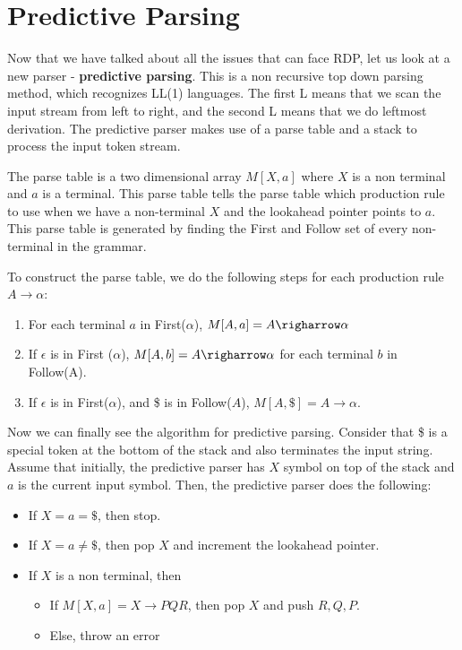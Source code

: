 \documentclass[12pt,letterpaper]{amsbook}
\theoremstyle{definition}
\begin{document}
\section{Predictive Parsing}

Now that we have talked about all the issues that can face RDP, let us look at a new parser - \textbf{predictive parsing}. This is a non recursive top down parsing method, which recognizes LL(1) languages. The first L means that we scan the input stream from left to right, and the second L means that we do leftmost derivation. The predictive parser makes use of a parse table and a stack to process the input token stream.

The parse table is a two dimensional array $M[X,a]$ where $X$ is a non terminal and $a$ is a terminal. This parse table tells the parse table which production rule to use when we have a non-terminal $X$ and the lookahead pointer points to $a$. This parse table is generated by finding the First and Follow set of every non-terminal in the grammar.

To construct the parse table, we do the following steps for each production rule $A \rightarrow \alpha$:

\begin{enumerate}
  \item For each terminal $a$ in First($\alpha$), $M[A,a] = A \righarrow \alpha$
  \item If $\epsilon$ is in First ($\alpha$), $M[A,b] = A \righarrow \alpha$ for each terminal $b$ in Follow(A).
  \item If $\epsilon$ is in First($\alpha$), and \$ is in Follow($A$), $M[A,\$] = A \rightarrow \alpha$.
\end{enumerate}

Now we can finally see the algorithm for predictive parsing. Consider that \$ is a special token at the bottom of the stack and also terminates the input string. Assume that initially, the predictive parser has $X$ symbol on top of the stack and $a$ is the current input symbol. Then, the predictive parser does the following:

\begin{itemize}
  \item If $X=a=\$$, then stop.
  \item If $X = a \neq \$$, then pop $X$ and increment the lookahead pointer.
  \item If $X$ is a non terminal, then
    \begin{itemize}
      \item If $M[X,a] = X \rightarrow PQR$, then pop $X$ and push $R,Q,P$.
      \item Else, throw an error
    \end{itemize}
\end{itemize}
\end{document}
